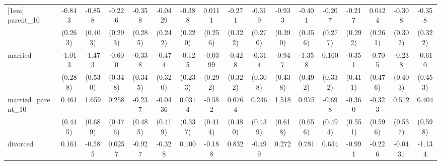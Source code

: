 {\begin{tabular}{l*{16}{c}}
[1em]
parent\_10           &      -0.843\sym{**} &      -0.858\sym{*}  &      -0.226         &      -0.358         &     -0.0429         &      -0.388         &      0.0111         &      -0.271         &      -0.319         &      -0.933\sym{*}  &      -0.401         &      -0.207         &      -0.217         &      0.0424         &      -0.308         &      -0.358         \\
                    &     (0.263)         &     (0.403)         &     (0.293)         &     (0.285)         &     (0.242)         &     (0.220)         &     (0.256)         &     (0.322)         &     (0.270)         &     (0.390)         &     (0.356)         &     (0.277)         &     (0.292)         &     (0.261)         &     (0.302)         &     (0.322)         \\
[1em]
married             &      -1.013\sym{***}&      -1.473\sym{**} &      -0.600         &      -0.338         &      -0.474         &      -0.125         &     -0.0399         &      -0.428         &      -0.314         &      -0.947\sym{*}  &      -1.358\sym{**} &       0.160         &      -0.351         &      -0.705         &      -0.238         &      -0.610         \\
                    &     (0.288)         &     (0.530)         &     (0.348)         &     (0.345)         &     (0.320)         &     (0.233)         &     (0.292)         &     (0.322)         &     (0.308)         &     (0.438)         &     (0.492)         &     (0.332)         &     (0.411)         &     (0.476)         &     (0.403)         &     (0.453)         \\
[1em]
married\_parent\_10   &       0.461         &       1.659\sym{*}  &       0.258         &      -0.237         &     -0.0436         &      0.0314         &      -0.582         &      0.0764         &       0.246         &       1.518\sym{*}  &       0.975         &      -0.698         &      -0.360         &      -0.323         &       0.512         &       0.404         \\
                    &     (0.445)         &     (0.689)         &     (0.476)         &     (0.485)         &     (0.419)         &     (0.337)         &     (0.414)         &     (0.480)         &     (0.439)         &     (0.618)         &     (0.656)         &     (0.494)         &     (0.551)         &     (0.596)         &     (0.537)         &     (0.598)         \\
[1em]
divorced            &       0.161         &      -0.585         &      0.0257         &      -0.927         &      -0.328         &       0.100         &      -0.188         &       0.832\sym{*}  &      -0.499         &       0.272         &       0.781         &       0.634         &      -0.991         &      -0.226         &     -0.0431         &      -1.134         \\

\end{tabular}}
